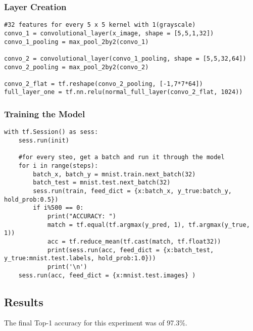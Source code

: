 \subsubsection*{Layer Creation}
\begin{lstlisting}[style=Python]
#32 features for every 5 x 5 kernel with 1(grayscale)
convo_1 = convolutional_layer(x_image, shape = [5,5,1,32])
convo_1_pooling = max_pool_2by2(convo_1)

convo_2 = convolutional_layer(convo_1_pooling, shape = [5,5,32,64])
convo_2_pooling = max_pool_2by2(convo_2)

convo_2_flat = tf.reshape(convo_2_pooling, [-1,7*7*64])
full_layer_one = tf.nn.relu(normal_full_layer(convo_2_flat, 1024))
\end{lstlisting}

\subsubsection*{Training the Model}
\begin{lstlisting}[style=Python]
with tf.Session() as sess:
    sess.run(init)
    
    #for every steo, get a batch and run it through the model
    for i in range(steps):
        batch_x, batch_y = mnist.train.next_batch(32)
        batch_test = mnist.test.next_batch(32)
        sess.run(train, feed_dict = {x:batch_x, y_true:batch_y, hold_prob:0.5})
        if i%500 == 0:
            print("ACCURACY: ")
            match = tf.equal(tf.argmax(y_pred, 1), tf.argmax(y_true, 1))
            acc = tf.reduce_mean(tf.cast(match, tf.float32))
            print(sess.run(acc, feed_dict = {x:batch_test, y_true:mnist.test.labels, hold_prob:1.0}))
            print('\n')     
    sess.run(acc, feed_dict = {x:mnist.test.images} )
\end{lstlisting}

\subsection*{Results}
The final Top-1 accuracy for this experiment was of 97.3\%.